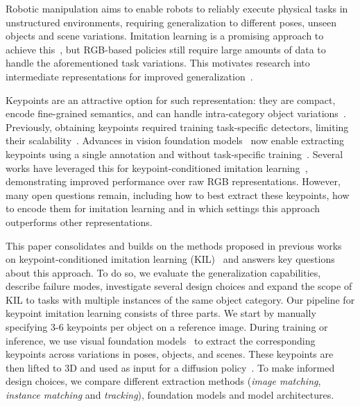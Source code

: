 \documentclass[letterpaper, 10 pt, conference]{ieeeconf}  %
\begin{document}
Robotic manipulation aims to enable robots to reliably execute physical tasks in unstructured environments, requiring generalization to different poses, unseen objects and scene variations. Imitation learning is a promising approach to achieve this~\cite{chi2025diffusion_policy,barreiros2025LBM-1}, but RGB-based policies still require large amounts of data to handle the aforementioned task variations\cite{barreiros2025LBM-1,lin2025imitation_scaling_laws}. This motivates research into intermediate representations for improved generalization~\cite{ze20243d,yang2025S2,zhu2023viola,zhu2023learning,wang2025skil,di2024KAT,Levy2025P3PO}.

Keypoints are an attractive option for such representation: they are compact, encode fine-grained semantics, and can handle intra-category object variations~\cite{manuelli2019kpam,adriaens2025spill}. Previously, obtaining keypoints required training task-specific detectors, limiting their scalability~\cite{adriaens2025spill,manuelli2019kpam,vecerik2021s3k}. Advances in vision foundation models~\cite{simeoni2025dinov3,heinrich2025radiov2.5,rombach2022stable-diffusion} now enable extracting keypoints using a single annotation and without task-specific training~\cite{amir2021ViTFeatures,tang2023dift}. Several works have leveraged this for keypoint-conditioned imitation learning~\cite{di2024KAT,wang2025skil,Levy2025P3PO,haldar2025pointpolicy}, demonstrating improved performance over raw RGB representations. However, many open questions remain, including how to best extract these keypoints, how to encode them for imitation learning and in which settings this approach outperforms other representations.

This paper consolidates and builds on the methods proposed in previous works on keypoint-conditioned imitation learning (KIL)~\cite{di2024KAT,wang2025skil,Levy2025P3PO,haldar2025pointpolicy} and answers key questions about this approach. To do so, we evaluate the generalization capabilities, describe failure modes, investigate several design choices and expand the scope of KIL to tasks with multiple instances of the same object category.
Our pipeline for keypoint imitation learning consists of three parts. We start by manually specifying $3$-$6$ keypoints per object on a reference image. During training or inference, we use visual foundation models~\cite{bommasani2021foundation-models} to extract the corresponding keypoints across variations in poses, objects, and scenes. These keypoints are then lifted to 3D and used as input for a diffusion policy~\cite{chi2025diffusion_policy}. To make informed design choices, we compare different extraction methods (\textit{image matching}, \textit{instance matching} and \textit{tracking}), foundation models and model architectures.
\end{document}
